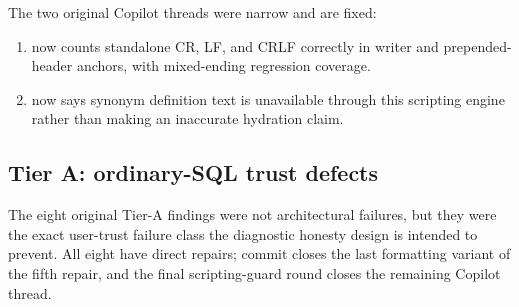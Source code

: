 \documentclass[11pt]{article}
\newcommand{\code}[1]{\texttt{\detokenize{#1}}}
\begin{document}
The two original Copilot threads were narrow and are fixed:

\begin{enumerate}
  \item {} now counts standalone CR, LF, and CRLF correctly in writer and prepended-header anchors, with mixed-ending regression coverage.
  \item {} now says synonym definition text is unavailable through this scripting engine rather than making an inaccurate hydration claim.
\end{enumerate}

\subsection{Tier A: ordinary-SQL trust defects}\label{sec:tiera}

The eight original Tier-A findings were not architectural failures, but they were the exact user-trust failure class the diagnostic honesty design is intended to prevent. All eight have direct repairs; commit \code{2bc5811e3} closes the last formatting variant of the fifth repair, and the final scripting-guard round closes the remaining Copilot thread.
\end{document}
